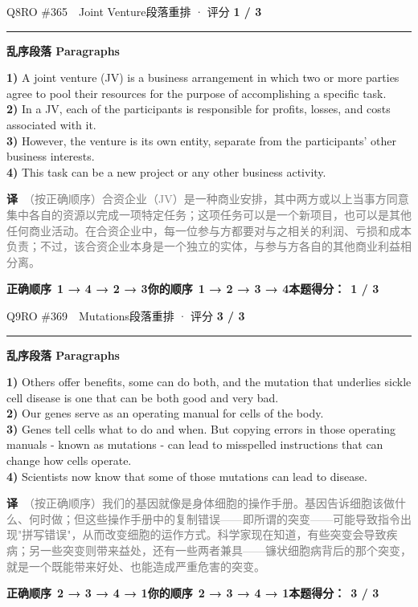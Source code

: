 \documentclass[11pt]{article}
\newcommand{\ptesub}[1]{%
  \par\needspace{2\baselineskip}\smallskip
  {\color{cAccent}\rule[-0.2ex]{3pt}{1.05em}}\hspace{6pt}%
  {\bfseries\color{cHead}#1}\par\nopagebreak\smallskip}
\newcommand{\zh}[1]{{\footnotesize\textcolor{cNote}{\textbf{译}}\ \textcolor{gray}{#1}}}
\begin{document}
\begin{qblock}{Q8\quad RO \#365\ \ Joint Venture}{段落重排 · 评分 \textcolor{cAccent}{\bfseries 1 / 3}}
\ptesub{乱序段落 Paragraphs}
\begin{promptbox}
\textbf{1)} A joint venture (JV) is a business arrangement in which two or more parties agree to pool their resources for the purpose of accomplishing a specific task.\\
\textbf{2)} In a JV, each of the participants is responsible for profits, losses, and costs associated with it.\\
\textbf{3)} However, the venture is its own entity, separate from the participants' other business interests.\\
\textbf{4)} This task can be a new project or any other business activity.
\end{promptbox}
\zh{（按正确顺序）合资企业（JV）是一种商业安排，其中两方或以上当事方同意集中各自的资源以完成一项特定任务；这项任务可以是一个新项目，也可以是其他任何商业活动。在合资企业中，每一位参与方都要对与之相关的利润、亏损和成本负责；不过，该合资企业本身是一个独立的实体，与参与方各自的其他商业利益相分离。}
\par\smallskip
\textbf{正确顺序}\ \textcolor{cFix}{\bfseries 1 → 4 → 2 → 3}\qquad\textbf{你的顺序}\ {\color{cWrong}\bfseries 1 → 2 → 3 → 4}\qquad\textbf{本题得分：}\ {\color{cAccent}\bfseries 1 / 3}
\end{qblock}

\begin{qblock}{Q9\quad RO \#369\ \ Mutations}{段落重排 · 评分 \textcolor{cAccent}{\bfseries 3 / 3}}
\ptesub{乱序段落 Paragraphs}
\begin{promptbox}
\textbf{1)} Others offer benefits, some can do both, and the mutation that underlies sickle cell disease is one that can be both good and very bad.\\
\textbf{2)} Our genes serve as an operating manual for cells of the body.\\
\textbf{3)} Genes tell cells what to do and when. But copying errors in those operating manuals - known as mutations - can lead to misspelled instructions that can change how cells operate.\\
\textbf{4)} Scientists now know that some of those mutations can lead to disease.
\end{promptbox}
\zh{（按正确顺序）我们的基因就像是身体细胞的操作手册。基因告诉细胞该做什么、何时做；但这些操作手册中的复制错误——即所谓的突变——可能导致指令出现"拼写错误"，从而改变细胞的运作方式。科学家现在知道，有些突变会导致疾病；另一些突变则带来益处，还有一些两者兼具——镰状细胞病背后的那个突变，就是一个既能带来好处、也能造成严重危害的突变。}
\par\smallskip
\textbf{正确顺序}\ \textcolor{cFix}{\bfseries 2 → 3 → 4 → 1}\qquad\textbf{你的顺序}\ \textcolor{cFix}{\bfseries 2 → 3 → 4 → 1}\qquad\textbf{本题得分：}\ {\color{cAccent}\bfseries 3 / 3}
\end{qblock}
\end{document}
